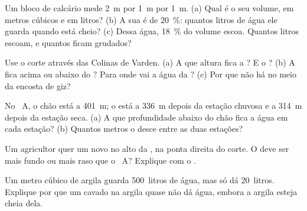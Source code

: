 \begin{exercise}[$\star\star$]\label{exo:g6:water-underground:6}
Um bloco de calcário mede 2~m por 1~m por 1~m. (a) Qual é o seu volume, em
metros cúbicos e em litros? (b) A sua  é de 20~\%: quantos
litros de água ele guarda quando está cheio? (c) Dessa água, 18~\% do
volume escoa. Quantos litros escoam, e quantos ficam grudados?
\end{exercise}

\begin{exercise}[$\star\star$]\label{exo:g6:water-underground:7}
Use o corte através das Colinas de Varden. (a) A que altura fica a ?
E o ? (b) A  fica acima ou abaixo do ? Para onde vai a água da
? (c) Por que não há  no meio da encosta de giz?
\end{exercise}

\begin{exercise}[$\star\star$]\label{exo:g6:water-underground:8}
No ~A, o chão está a 401~m; o  está a 336~m depois da
estação chuvosa e a 314~m depois da estação seca. (a) A que profundidade
abaixo do chão fica a água em cada estação? (b) Quantos metros o  desce entre as duas estações?
\end{exercise}

\begin{exercise}[$\star\star$]\label{exo:g6:water-underground:9}
Um agricultor quer um novo  no alto da , na ponta direita do
corte. O  deve ser mais fundo ou mais raso que o ~A? Explique com o
.
\end{exercise}

\begin{exercise}[$\star\star$]\label{exo:g6:water-underground:10}
Um metro cúbico de argila guarda 500~litros de água, mas só dá 20~litros.
Explique por que um  cavado na argila quase não dá água, embora a
argila esteja cheia dela.
\end{exercise}

